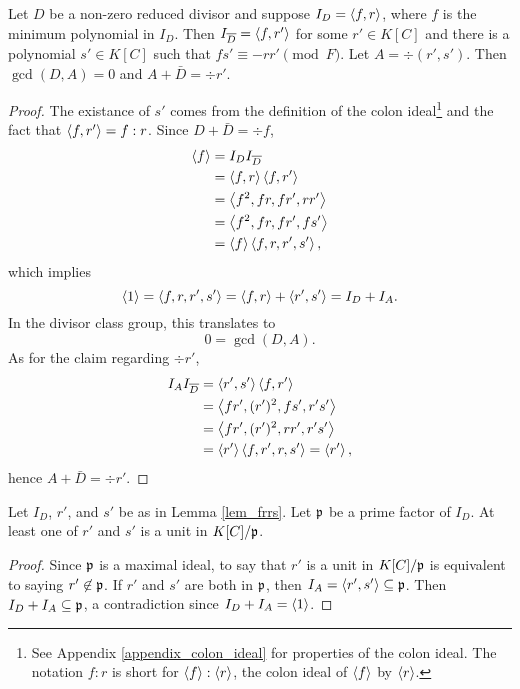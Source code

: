 \begin{lemma}
  \label{lem_frrs}
  Let $D$ be a non-zero reduced divisor
  and suppose $I_D = \left\langle f, r \right\rangle$, where $f$ is the minimum polynomial in $I_D$.
  Then $I_{\overline D} = \left\langle f, r' \right\rangle$ for some $r' \in K[C]$
  and there is a polynomial $s' \in K[C]$ such that $fs' \equiv -rr' \pmod F$.
  Let $A = \div(r', s')$. Then $\gcd(D, A) = 0$ and $A + \bar D = \div r'$.
\end{lemma}
\begin{proof}
  The existance of $s'$ comes from the definition of the colon ideal\footnote{
  See Appendix \ref{appendix_colon_ideal} for properties of the colon ideal.
  The notation $f : r$ is short for $\left\langle f \right\rangle : \left\langle r \right\rangle$, the colon ideal of $\left\langle f \right\rangle$ by $\left\langle r \right\rangle$.}
  and the fact that $\left\langle f,r' \right\rangle = f : r$.
  Since $D + \bar D = \div f$,
  \begin{align*}
    \left\langle f \right\rangle
      &= I_D I_{\overline D} \\
      &= \left\langle f, r \right\rangle \left\langle f, r' \right\rangle \\
      &= \left\langle f^2, fr, fr', rr' \right\rangle \\
      &= \left\langle f^2, fr, fr', fs' \right\rangle \\
      &= \left\langle f \right\rangle \left\langle f, r, r', s' \right\rangle,
  \end{align*}
  which implies
  \[ \left\langle 1 \right\rangle = \left\langle f, r, r', s' \right\rangle = \left\langle f, r \right\rangle + \left\langle r', s' \right\rangle = I_D + I_A. \]
  In the divisor class group, this translates to
  \[ 0 = \gcd(D, A). \]
  As for the claim regarding $\div r'$,
  \begin{align*}
    I_AI_{\overline D}
      &= \left\langle r', s' \right\rangle\left\langle f, r' \right\rangle \\
      &= \left\langle fr', (r')^2, fs', r's' \right\rangle \\
      &= \left\langle fr', (r')^2, rr', r's' \right\rangle \\
      &= \left\langle r' \right\rangle\left\langle f, r', r, s' \right\rangle = \left\langle r' \right\rangle,
  \end{align*}
  hence $A + \bar D = \div r'$.
\end{proof}

\begin{lemma}
  \label{lem_frrs2}
  Let $I_D$, $r'$, and $s'$ be as in Lemma \ref{lem_frrs}.
  Let $\frak p$ be a prime factor of $I_D$.
  At least one of $r'$ and $s'$ is a unit in $K[C]/\frak p$.
\end{lemma}
\begin{proof}
  Since $\frak p$ is a maximal ideal,
  to say that $r'$ is a unit in $K[C]/\frak p$ is equivalent to saying $r' \not\in \frak p$.
  If $r'$ and $s'$ are both in $\frak p$, then $I_A = \left\langle r', s' \right\rangle \subseteq \frak p$.
  Then $I_D + I_A \subseteq \frak p$, a contradiction since $I_D + I_A = \left\langle 1 \right\rangle$.
\end{proof}

